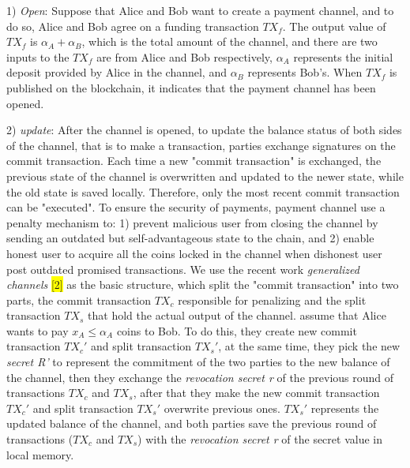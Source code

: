 \documentclass[conference]{IEEEtran}
\begin{document}
1) \emph{Open}: Suppose that Alice and Bob want to create a payment channel, and to do so, Alice and Bob agree on a funding transaction 
$TX_f$. The output value of $TX_f$ is $\alpha_A+\alpha_B$, which is the total amount of the channel, and there are two inputs 
to the $TX_f$ are from Alice and Bob respectively, $\alpha_A$ represents the initial deposit provided by Alice in the channel, 
and $\alpha_B$ represents Bob's. When $TX_f$ is published on the blockchain, it indicates that the payment channel has been opened.

2) \emph{update}: After the channel is opened, to update the balance status of both sides of the channel, that is to make a 
transaction, parties exchange signatures on the commit transaction. Each time a new "commit transaction" is exchanged, the 
previous state of the channel is overwritten and updated to the newer state, while the old state is saved locally. Therefore, 
only the most recent commit transaction can be "executed". To ensure the security of payments, payment channel use a penalty 
mechanism to: 1) prevent malicious user from closing the channel by sending an outdated but self-advantageous state to the chain, 
and 2) enable honest user to acquire all the coins locked in the channel when dishonest user post outdated promised transactions. 
We use the recent work \emph{generalized channels} \colorbox{yellow}{[2]} as the basic structure, which split the "commit transaction" 
into two parts, the commit transaction $TX_c$ responsible for penalizing and the split transaction $TX_s$ that hold the actual output 
of the channel. assume that Alice wants to pay $x_A \leq \alpha_A$ coins to Bob. To do this, they create new commit transaction $TX_c'$ 
and split transaction $TX_s'$, at the same time, they pick the new \emph{secret R'} to represent the commitment of the two parties 
to the new balance of the channel, then they exchange the \emph{revocation secret r} of the previous round of transactions $TX_c$ 
and $TX_s$, after that they make the new commit transaction $TX_c'$ and split transaction $TX_s'$ overwrite previous ones. $TX_s'$ 
represents the updated balance of the channel, and both parties save the previous round of transactions ($TX_c$ and $TX_s$) with the 
\emph{revocation secret r} of the secret value in local memory.
\end{document}
